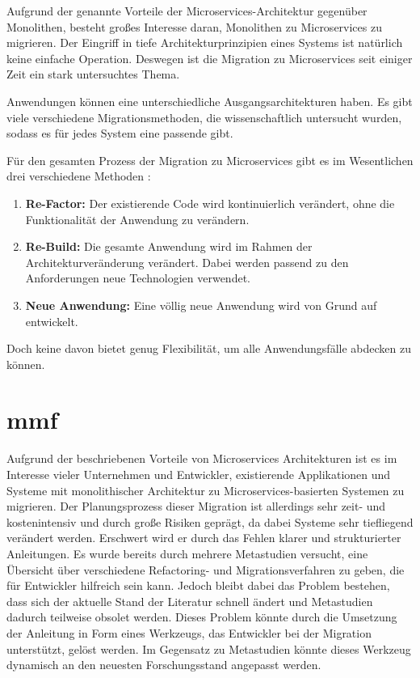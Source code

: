 Aufgrund der genannte Vorteile der Microservices-Architektur gegenüber Monolithen, besteht großes Interesse daran, Monolithen zu Microservices zu migrieren.
Der Eingriff in tiefe Architekturprinzipien eines Systems ist natürlich keine einfache Operation.
Deswegen ist die Migration zu Microservices seit einiger Zeit ein stark untersuchtes Thema.

Anwendungen können eine unterschiedliche Ausgangsarchitekturen haben.
Es gibt viele verschiedene Migrationsmethoden, die wissenschaftlich untersucht wurden, sodass es für jedes System eine passende gibt.

Für den gesamten Prozess der Migration zu Microservices gibt es im Wesentlichen drei verschiedene Methoden \cite{master-daniel-koch}:
\begin{enumerate}
	\item \textbf{Re-Factor:} Der existierende Code wird kontinuierlich verändert, ohne die Funktionalität der Anwendung zu verändern.
	\item \textbf{Re-Build:} Die gesamte Anwendung wird im Rahmen der Architekturveränderung verändert. Dabei werden passend zu den Anforderungen neue Technologien verwendet.
	\item \textbf{Neue Anwendung:} Eine völlig neue Anwendung wird von Grund auf entwickelt.
\end{enumerate}

Doch keine davon bietet genug Flexibilität, um alle Anwendungsfälle abdecken zu können.

\section{\acrfull{mmf}}
\label{sec:mmf}

Aufgrund der beschriebenen Vorteile von Microservices Architekturen ist es im Interesse vieler Unternehmen und Entwickler, existierende Applikationen und Systeme mit monolithischer Architektur zu Microservices-basierten Systemen zu migrieren.
Der Planungsprozess dieser Migration ist allerdings sehr zeit- und kostenintensiv und durch große Risiken geprägt, da dabei Systeme sehr tiefliegend verändert werden.
Erschwert wird er durch das Fehlen klarer und strukturierter Anleitungen.
Es wurde bereits durch mehrere Metastudien versucht, eine Übersicht über verschiedene Refactoring- und Migrationsverfahren zu geben, die für Entwickler hilfreich sein kann.
Jedoch bleibt dabei das Problem bestehen, dass sich der aktuelle Stand der Literatur schnell ändert und Metastudien dadurch teilweise obsolet werden.
Dieses Problem könnte durch die Umsetzung der Anleitung in Form eines Werkzeugs, das Entwickler bei der Migration unterstützt, gelöst werden.
Im Gegensatz zu Metastudien könnte dieses Werkzeug dynamisch an den neuesten Forschungsstand angepasst werden.

